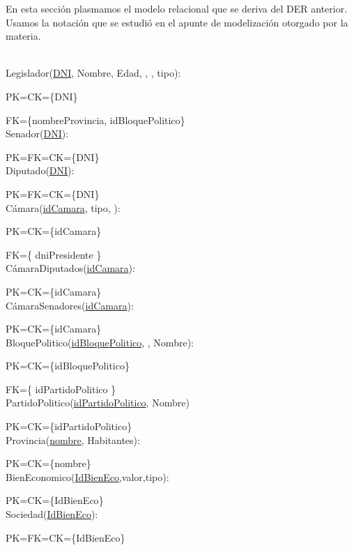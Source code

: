 En esta secci\'on plasmamos el modelo relacional que se deriva del DER anterior. Usamos la notaci\'on que se estudi\'o en el apunte de modelizaci\'on otorgado por la materia.

\\

Legislador(\underline{DNI}, Nombre, Edad, , , tipo):

PK=CK={\{DNI}\}

FK={\{nombreProvincia, idBloquePolitico}\} \\

Senador(\underline{DNI}):

PK=FK=CK={\{DNI}\}\\

Diputado(\underline{DNI}):

PK=FK=CK={\{DNI}\}\\

C\'amara(\underline{idCamara}, tipo, ):

PK=CK={\{idCamara}\}

FK={\{ dniPresidente }\} \\

C\'amaraDiputados(\underline{idCamara}):

PK=CK={\{idCamara}\} \\

C\'amaraSenadores(\underline{idCamara}):

PK=CK={\{idCamara}\} \\

BloquePolitico(\underline{idBloquePolitico}, , Nombre):

PK=CK={\{idBloquePolitico}\}

FK={\{ idPartidoPolitico }\} \\

PartidoPolitico(\underline{idPartidoPolitico}, Nombre)

PK=CK={\{idPartidoPolitico}\}\\

Provincia(\underline{nombre}, Habitantes):

PK=CK={\{nombre}\}\\

BienEconomico(\underline{IdBienEco},valor,tipo):

PK=CK={\{IdBienEco}\}\\

Sociedad(\underline{IdBienEco}):

PK=FK=CK={\{IdBienEco}\}\\

